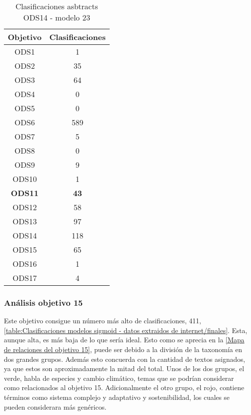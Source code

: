 \begin{table}[H]
    \begin{tabular}{| c | c |}
        \hline
        Objetivo & Clasificaciones \\
        \hline \hline
        ODS1   & 1   \\ \hline
        ODS2   & 35  \\ \hline
        ODS3   & 64  \\ \hline
        ODS4   & 0   \\ \hline
        ODS5   & 0   \\ \hline
        ODS6   & 589 \\ \hline
        ODS7   & 5   \\ \hline
        ODS8   & 0   \\ \hline
        ODS9   & 9   \\ \hline
        ODS10  & 1   \\ \hline
        \textbf{ODS11}  & \textbf{43}  \\ \hline
        ODS12  & 58  \\ \hline
        ODS13  & 97  \\ \hline
        ODS14  & 118 \\ \hline
        ODS15  & 65  \\ \hline
        ODS16  & 1   \\ \hline
        ODS17  & 4   \\ \hline
    \end{tabular}
    \caption{Clasificaciones asbtracts ODS14 - modelo 23}
    \label{table:Clasificaciones asbtracts ODS14 - modelo 23}
\end{table}


\subsubsection{Análisis objetivo 15}
Este objetivo consigue un número más alto de clasificaciones, 411,
\cref{table:Clasificaciones modelos sigmoid - datos extraidos de
internet/finales}. Esta, aunque alta, es más baja de lo que sería ideal. Esto
como se aprecia en la \cref{Mapa de relaciones del objetivo 15}, puede ser debido
a la división de la taxonomía en dos grandes grupos. Además esto concuerda con
la cantidad de textos asignados, ya que estos son aproximadamente la mitad del
total. Unos de los dos grupos, el verde, habla de especies y cambio climático,
temas que se podrían considerar como relacionados al objetivo 15. Adicionalmente
el otro grupo, el rojo, contiene términos como sistema complejo y adaptativo y
sostenibilidad, los cuales se pueden considerara más genéricos.


